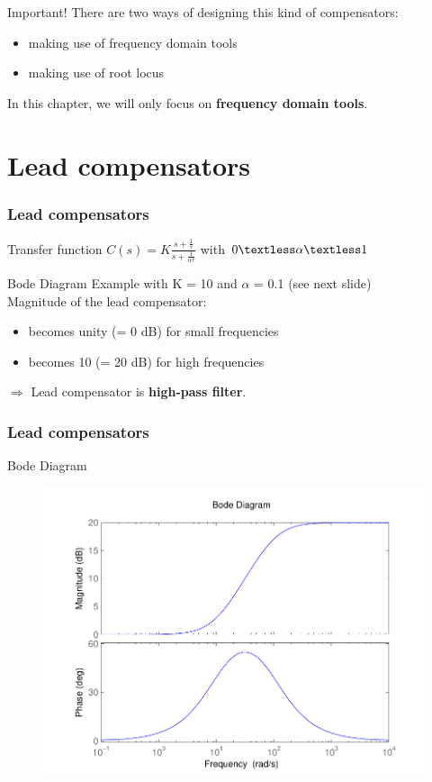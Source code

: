 \begin{frame}
\begin{block}{Important!}
There are two ways of designing this kind of compensators:
\begin{itemize}
\item making use of frequency domain tools
\item making use of root locus
\end{itemize}
In this chapter, we will only focus on {\bf frequency domain tools}.
\end{block}
\end{frame}

\section{Lead compensators}

\begin{frame}
\frametitle{Lead compensators}
	\begin{block}{Transfer function}
		$C(s) = K\frac{s + \frac{1}{\tau}}{s + \frac{1}{\alpha\tau}}$ with $0 \textless  \alpha  \textless  1$
	\end{block}
	\begin{block}{Bode Diagram}
		Example with K = 10 and $\alpha$ = 0.1 (see next slide) \\
		Magnitude of the lead compensator:
		\begin{itemize}
			\item becomes unity (= 0 dB) for small frequencies
			\item becomes 10 (= 20 dB) for high frequencies
		\end{itemize}
		$\Rightarrow$ Lead compensator is {\bf high-pass filter}.
	\end{block}
\end{frame}

\begin{frame}
\frametitle{Lead compensators}
\begin{block}{Bode Diagram}
\begin{figure}
	\centering
	\includegraphics[width=0.7
	\linewidth]{bodeleadfilter2}
\end{figure}
\end{block}
\end{frame}

